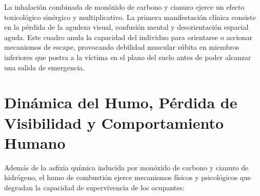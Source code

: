 La inhalación combinada de monóxido de carbono y cianuro ejerce un efecto toxicológico sinérgico y multiplicativo. La
primera manifestación clínica consiste en la pérdida de la agudeza visual, confusión mental y desorientación espacial
aguda. Este cuadro anula la capacidad del individuo para orientarse o accionar mecanismos de escape, provocando debilidad
muscular súbita en miembros inferiores que postra a la víctima en el plano del suelo antes de poder alcanzar una salida de
emergencia.

\section{Dinámica del Humo, Pérdida de Visibilidad y Comportamiento Humano}

Además de la asfixia química inducida por monóxido de carbono y cianuro de hidrógeno, el humo de combustión ejerce
mecanismos físicos y psicológicos que degradan la capacidad de supervivencia de los ocupantes:

